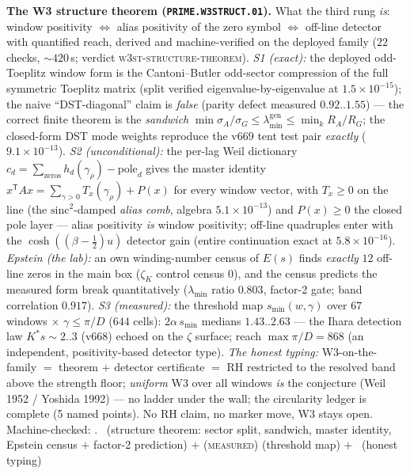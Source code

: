 \par\smallskip\noindent\textbf{The W3 structure theorem
(\texttt{PRIME.W3STRUCT.01}).}
What the third rung \emph{is}: window positivity $\Leftrightarrow$
alias positivity of the zero symbol $\Leftrightarrow$ off-line
detector with quantified reach, derived and machine-verified on the
deployed family ($22$ checks, ${\sim}420$\,s; verdict
\textsc{w3st-structure-theorem}).  \emph{S1 (exact):} the deployed
odd-Toeplitz window form is the Cantoni--Butler odd-sector
compression of the full symmetric Toeplitz matrix (split verified
eigenvalue-by-eigenvalue at $1.5\times10^{-15}$); the naive
``DST-diagonal'' claim is \emph{false} (parity defect measured
$0.92..1.55$) --- the correct finite theorem is the \emph{sandwich}
$\min\sigma_A/\sigma_G\le\lambda_{\min}^{\mathrm{gen}}\le
\min_k R_A/R_G$; the closed-form DST mode weights reproduce the
v669 tent test pair \emph{exactly} ($9.1\times10^{-13}$).
\emph{S2 (unconditional):} the per-lag Weil dictionary
$c_d=\sum_{\text{zeros}}h_d(\gamma_\rho)-\mathrm{pole}_d$ gives the
master identity $x^{\mathsf T}Ax=\sum_{\gamma>0}T_x(\gamma_\rho)
+P(x)$ for every window vector, with $T_x\ge0$ on the line (the
$\mathrm{sinc}^2$-damped \emph{alias comb}, algebra
$5.1\times10^{-13}$) and $P(x)\ge0$ the closed pole layer --- alias
positivity \emph{is} window positivity; off-line quadruples enter
with the $\cosh((\beta-\tfrac12)u)$ detector gain (entire
continuation exact at $5.8\times10^{-16}$).  \emph{Epstein (the
lab):} an own winding-number census of $E(s)$ finds \emph{exactly}
$12$ off-line zeros in the main box ($\zeta_K$ control census $0$),
and the census predicts the measured form break quantitatively
($\lambda_{\min}$ ratio $0.803$, factor-2 gate; band correlation
$0.917$).  \emph{S3 (measured):} the threshold map
$s_{\min}(w,\gamma)$ over $67$ windows $\times$ $\gamma\le\pi/D$
($644$ cells): $2\alpha\,s_{\min}$ medians $1.43..2.63$ --- the
Ihara detection law $K^*s\sim2..3$ (v668) echoed on the $\zeta$
surface; reach $\max\pi/D=868$ (an independent, positivity-based
detector type).  \emph{The honest typing:} W3-on-the-family $=$
theorem $+$ detector certificate $=$ RH restricted to the resolved
band above the strength floor; \emph{uniform} W3 over all windows
\emph{is} the conjecture (Weil 1952 / Yoshida 1992) --- no ladder
under the wall; the circularity ledger is complete (5 named
points).  No RH claim, no marker move, W3 stays open.
Machine-checked: .
\mE\ (structure theorem: sector split, sandwich, master identity,
Epstein census $+$ factor-2 prediction) $+$ (\textsc{measured})
(threshold map) $+$ \mC\ (honest typing)
\par\smallskip


